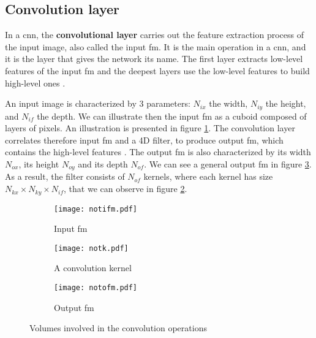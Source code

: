 \subsection{Convolution layer} \label{subs:2dconv}
In a \acrshort{cnn}, the \textbf{convolutional layer} carries out the feature extraction process of the input image, also called the input \acrfull{fm}. It is the main operation in a \acrshort{cnn}, and it is the layer that gives the network its name. The first layer extracts low-level features of the input \acrshort{fm} and the deepest layers use the low-level features to build high-level ones \cite{goodfellow_deep_2016}.

An input image is characterized by 3 parameters: \textbf{$N_{ix}$} the width, \textbf{$N_{iy}$} the height, and \textbf{$N_{if}$} the depth. We can illustrate then the input \acrshort{fm} as a cuboid composed of layers of pixels. An illustration is presented in figure \ref{fig:notation:ifm}.
The convolution layer correlates therefore input \acrshort{fm} and a 4D filter, to produce output \acrshort{fm}, which contains the high-level features \cite{zhao_towards_2018}. The output \acrshort{fm} is also characterized by its width $N_{ox}$, its height $N_{oy}$ and its depth $N_{of}$. We can see a general output \acrshort{fm} in figure \ref{fig:notation:ofm}. As a result, the filter consists of $N_{of}$ kernels, where each kernel has size $N_{kx} \times N_{ky} \times N_{if}$, that we can observe in figure \ref{fig:notation:k}.
%
\begin{figure}
    \centering
    \begin{subfigure}{.32\textwidth}
    \centering
    \texttt{[image: notifm.pdf]}
    \caption{Input \acrshort{fm}}
    \label{fig:notation:ifm}
    \end{subfigure}
    \begin{subfigure}{.32\textwidth}
    \centering
    \texttt{[image: notk.pdf]}
    \caption{A convolution kernel}
    \label{fig:notation:k}
    \end{subfigure}
    \begin{subfigure}{.32\textwidth}
    \centering
    \texttt{[image: notofm.pdf]}
    \caption{Output \acrshort{fm}}
    \label{fig:notation:ofm}
    \end{subfigure}
    \caption{Volumes involved in the convolution operations}
    \label{fig:notconv}
\end{figure}


